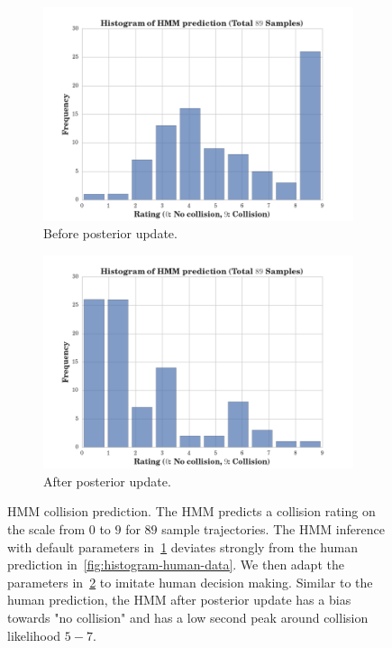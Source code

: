 \begin{figure}[t]
	\begin{subfigure}[t]{1\linewidth}
		\centering
		\includegraphics[width=0.95\linewidth]{figures/hmm_prior.png}
		\caption{Before posterior update.}
		\label{fig:hmm-coll-pred-prior}
	\end{subfigure}
	\begin{subfigure}[t]{1\linewidth}
		\centering
		\includegraphics[width=0.95\linewidth]{figures/hmm_posterior.png}
		\caption{After posterior update.}
		\label{fig:hmm-coll-pred-post}
	\end{subfigure}
	\caption{HMM collision prediction. The HMM predicts a collision rating on the scale from $0$ to $9$ for $89$ sample trajectories. The HMM inference with default parameters in~\cref{fig:hmm-coll-pred-prior} deviates strongly from the human prediction in~\cref{fig:histogram-human-data}. We then adapt the parameters in~\cref{fig:hmm-coll-pred-post} to imitate human decision making. Similar to the human prediction, the HMM after posterior update has a bias towards "no collision" and has a low second peak around collision likelihood $5-7$.}
	\label{fig:hmm-coll-pred}
\end{figure}
\\

